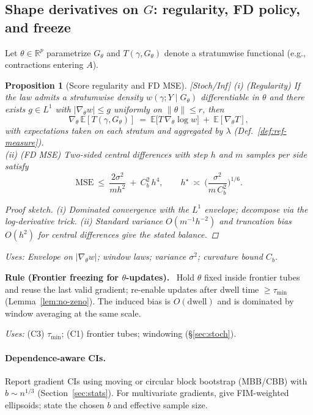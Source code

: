 \documentclass[10pt]{article}
\newenvironment{rulex}[1]{%
\begin{rulebox}\noindent\textbf{Rule (#1).}\ }{\end{rulebox}}
\newcommand{\uses}[1]{\par\smallskip\noindent\textit{Uses: }#1\par\smallskip}
\newenvironment{proofsketch}{\begin{proof}[Proof sketch]}{\end{proof}}
\newtheorem{proposition}{Proposition}
\begin{document}
\subsection{Shape derivatives on $G$: regularity, FD policy, and freeze}\label{subsec:shape}

Let $\theta\in\mathbb R^p$ parametrize $G_\theta$ and $T(\gamma,G_\theta)$ denote a stratumwise functional (e.g., contractions entering $A$).

\begin{proposition}[Score regularity and FD MSE]\label{prop:score-fd-7}
\emph{[\textup{Stoch/Inf}]}
(i) (\emph{Regularity}) If the law admits a stratumwise density $w(\gamma;Y\!\mid G_\theta)$ differentiable in $\theta$ and there exists $g\in L^1$ with $|\nabla_\theta w|\le g$ uniformly on $\|\theta\|\le r$, then
\[
\nabla_\theta\,\mathbb E[T(\gamma,G_\theta)]
\ =\ \mathbb E\big[T\,\nabla_\theta\log w\big]\ +\ \mathbb E[\nabla_\theta T],
\]
with expectations taken on each stratum and aggregated by $\lambda$ (Def.~\ref{def:ref-measure}).\\
(ii) (\emph{FD MSE}) Two-sided central differences with step $h$ and $m$ samples per side satisfy
\[
\mathrm{MSE}\ \le\ \frac{2\sigma^2}{m h^2}\ +\ C_b^2\,h^4,\qquad 
h^\star\ \asymp\ \Big(\frac{\sigma^2}{m\,C_b^2}\Big)^{\!1/6}.
\]
\begin{proofsketch}
(i) Dominated convergence with the $L^1$ envelope; decompose via the log-derivative trick. (ii) Standard variance $O(m^{-1}h^{-2})$ and truncation bias $O(h^2)$ for central differences give the stated balance.
\end{proofsketch}
\uses{Envelope on $|\nabla_\theta w|$; window laws; variance $\sigma^2$; curvature bound $C_b$.}
\end{proposition}

\begin{rulex}{Frontier freezing for $\theta$-updates}
Hold $\theta$ fixed inside frontier tubes and reuse the last valid gradient; re-enable updates after dwell time $\ge \tau_{\min}$ (Lemma~\ref{lem:no-zeno}). The induced bias is $O(\text{dwell})$ and is dominated by window averaging at the same scale.
\uses{(C3) $\tau_{\min}$; (C1) frontier tubes; windowing (§\ref{sec:stoch}).}
\end{rulex}

\paragraph{Dependence-aware CIs.}
Report gradient CIs using moving or circular block bootstrap (MBB/CBB) with $b\sim n^{1/3}$ (Section~\ref{sec:stats}). For multivariate gradients, give FIM-weighted ellipsoids; state the chosen $b$ and effective sample size.
\end{document}
